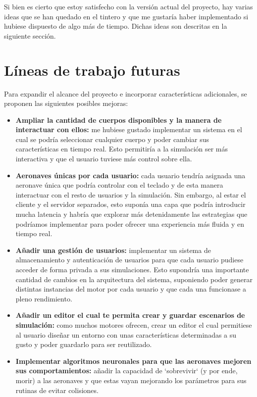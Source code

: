 Si bien es cierto que estoy satisfecho con la versión actual del proyecto, hay varias ideas que se han quedado en el tintero y que me gustaría haber implementado si hubiese dispuesto de algo más de tiempo. Dichas ideas son descritas en la siguiente sección.


\section{Líneas de trabajo futuras}

Para expandir el alcance del proyecto e incorporar características adicionales, se proponen las siguientes posibles mejoras:

\begin{itemize}
    \item \textbf{Ampliar la cantidad de cuerpos disponibles y la manera de interactuar con ellos:} me hubiese gustado implementar un sistema en el cual se podría seleccionar cualquier cuerpo y poder cambiar sus características en tiempo real. Esto permitiría a la simulación ser más interactiva y que el usuario tuviese más control sobre ella.
    \item \textbf{Aeronaves únicas por cada usuario:} cada usuario tendría asignada una aeronave única que podría controlar con el teclado y de esta manera interactuar con el resto de usuarios y la simulación. Sin embargo, al estar el cliente y el servidor separados, esto suponía una capa que podría introducir mucha latencia y habría que explorar más detenidamente las estrategias que podríamos implementar para poder ofrecer una experiencia más fluida y en tiempo real.
    \item \textbf{Añadir una gestión de usuarios:} implementar un sistema de almacenamiento y autenticación de usuarios para que cada usuario pudiese acceder de forma privada a sus simulaciones. Esto supondría una importante cantidad de cambios en la arquitectura del sistema, suponiendo poder generar distintas instancias del motor por cada usuario y que cada una funcionase a pleno rendimiento.
    \item \textbf{Añadir un editor el cual te permita crear y guardar escenarios de simulación:} como muchos motores ofrecen, crear un editor el cual permitiese al usuario diseñar un entorno con unas características determinadas a su gusto y poder guardarlo para ser reutilizado.
    \item \textbf{Implementar algoritmos neuronales para que las aeronaves mejoren sus comportamientos:} añadir la capacidad de `sobrevivir` (y por ende, morir) a las aeronaves y que estas vayan mejorando los parámetros para sus rutinas de evitar colisiones.

\end{itemize}
